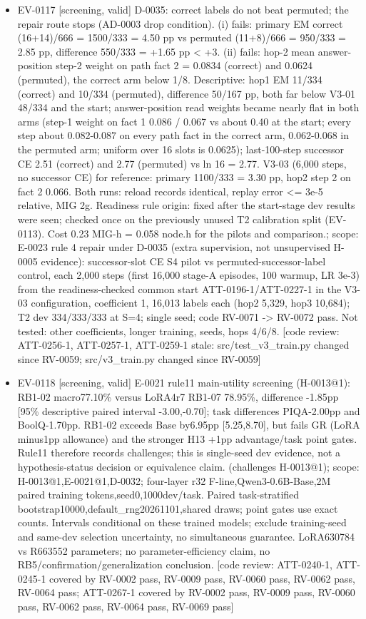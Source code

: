 \documentclass[11pt]{article}
\begin{document}
\begin{itemize}
\item EV-0117 [screening, valid] D-0035: correct labels do not beat permuted; the repair route stops (AD-0003 drop condition). (i) fails: primary EM correct (16+14)/666 = 1500/333 = 4.50 pp vs permuted (11+8)/666 = 950/333 = 2.85 pp, difference 550/333 = +1.65 pp \textless{} +3. (ii) fails: hop-2 mean answer-position step-2 weight on path fact 2 = 0.0834 (correct) and 0.0624 (permuted), the correct arm below 1/8. Descriptive: hop1 EM 11/334 (correct) and 10/334 (permuted), difference 50/167 pp, both far below V3-01 48/334 and the start; answer-position read weights became nearly flat in both arms (step-1 weight on fact 1 0.086 / 0.067 vs about 0.40 at the start; every step about 0.082-0.087 on every path fact in the correct arm, 0.062-0.068 in the permuted arm; uniform over 16 slots is 0.0625); last-100-step successor CE 2.51 (correct) and 2.77 (permuted) vs ln 16 = 2.77. V3-03 (6,000 steps, no successor CE) for reference: primary 1100/333 = 3.30 pp, hop2 step 2 on fact 2 0.066. Both runs: reload records identical, replay error \textless{}= 3e-5 relative, MIG 2g. Readiness rule origin: fixed after the start-stage dev results were seen; checked once on the previously unused T2 calibration split (EV-0113). Cost 0.23 MIG-h = 0.058 node.h for the pilots and comparison.; scope: E-0023 rule 4 repair under D-0035 (extra supervision, not unsupervised H-0005 evidence): successor-slot CE S4 pilot vs permuted-successor-label control, each 2,000 steps (first 16,000 stage-A episodes, 100 warmup, LR 3e-3) from the readiness-checked common start ATT-0196-1/ATT-0227-1 in the V3-03 configuration, coefficient 1, 16,013 labels each (hop2 5,329, hop3 10,684); T2 dev 334/333/333 at S=4; single seed; code RV-0071 -\textgreater{} RV-0072 pass. Not tested: other coefficients, longer training, seeds, hops 4/6/8. [code review: ATT-0256-1, ATT-0257-1, ATT-0259-1 stale: src/test\_v3\_train.py changed since RV-0059; src/v3\_train.py changed since RV-0059]
\item EV-0118 [screening, valid] E-0021 rule11 main-utility screening (H-0013@1): RB1-02 macro77.10\% versus LoRA4r7 RB1-07 78.95\%, difference -1.85pp [95\% descriptive paired interval -3.00,-0.70]; task differences PIQA-2.00pp and BoolQ-1.70pp. RB1-02 exceeds Base by6.95pp [5.25,8.70], but fails GR (LoRA minus1pp allowance) and the stronger H13 +1pp advantage/task point gates. Rule11 therefore records challenges; this is single-seed dev evidence, not a hypothesis-status decision or equivalence claim. (challenges H-0013@1); scope: H-0013@1,E-0021@1,D-0032; four-layer r32 F-line,Qwen3-0.6B-Base,2M paired training tokens,seed0,1000dev/task. Paired task-stratified bootstrap10000,default\_rng20261101,shared draws; point gates use exact counts. Intervals conditional on these trained models; exclude training-seed and same-dev selection uncertainty, no simultaneous guarantee. LoRA630784 vs R663552 parameters; no parameter-efficiency claim, no RB5/confirmation/generalization conclusion. [code review: ATT-0240-1, ATT-0245-1 covered by RV-0002 pass, RV-0009 pass, RV-0060 pass, RV-0062 pass, RV-0064 pass; ATT-0267-1 covered by RV-0002 pass, RV-0009 pass, RV-0060 pass, RV-0062 pass, RV-0064 pass, RV-0069 pass]

\end{itemize}
\end{document}
